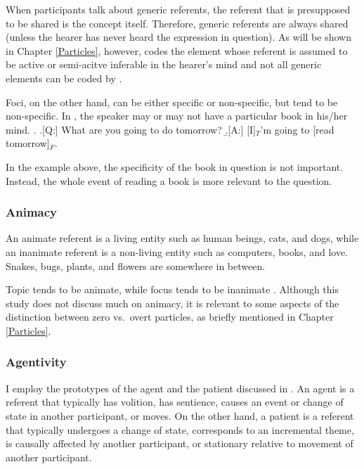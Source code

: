 When participants talk about generic referents,
the referent that is presupposed to be shared is the concept itself.
Therefore, generic referents are always shared
(unless the hearer has never heard the expression in question).
As will be shown in Chapter \ref{Particles}, however,
 codes the element whose referent is assumed to be active or semi-acitve inferable in the hearer's mind and
not all generic elements can be coded by .


Foci, on the other hand, can be either specific or non-specific,
but tend to be non-specific.
In \Next[A],
the speaker may or may not have a particular book in his/her mind.
%
\ex. \a.[Q:] What are you going to do tomorrow?
	\b.[A:] [I]$_{T}$'m going to [read  tomorrow]$_{F}$.

In the example above,
the specificity of the book in question is not important.
Instead, the whole event of reading a book is more relevant to the question.



\subsubsection{Animacy}

An animate referent is a living entity such as human beings, cats, and dogs,
while an inanimate referent is a non-living entity such as computers, books, and love.
Snakes, bugs, plants, and flowers are somewhere in between.

Topic tends to be animate,
while focus tends to be inanimate \cite{givon76,keenan76,comrie79,comrie83,dubois87}.
Although this study does not discuss much on animacy,
it is relevant to some aspects of the distinction between
zero vs.\ overt particles,
as briefly mentioned in Chapter \ref{Particles}.


\subsubsection{Agentivity}

I employ the prototypes of the agent and the patient
discussed in .
An agent is a referent
that typically has volition,
has sentience,
causes an event or change of state in another participant, or
moves.
On the other hand,
a patient is a referent
that typically undergoes a change of state,
corresponds to an incremental theme,
is causally affected by another participant, or
stationary relative to movement of another participant.

